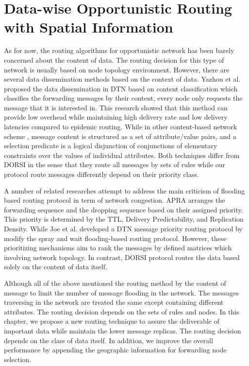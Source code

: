\chapter{Data-wise Opportunistic Routing with Spatial Information}
\label{DORSI}
As for now, the routing algorithms for opportunistic network has been barely concerned about the content of data. 
The routing decision for this type of network is usually based on node topology environment. 
However, there are several data dissemination methods based on the context of data. 
Yazhou et al. \cite{Jiao2009} proposed the data dissemination in DTN based on content classification which classifies the forwarding messages by their content, every node only requests the message that it is interested in. 
This research showed that this method can provide low overhead while maintaining high delivery rate and low delivery latencies compared to epidemic routing. 
While in other content-based network scheme \cite{Carzaniga2004}, message content is structured as a set of attribute/value pairs, and a selection predicate is a logical disjunction of conjunctions of elementary constraints over the values of individual attributes. 
Both techniques differ from DORSI in the sense that they route all messages by sets of rules while our protocol route messages differently depend on their priority class.

A number of related researches attempt to address the main criticism of flooding based routing protocol in term of network congestion. 
APRA \cite{Jin2009} arranges the forwarding sequence and the dropping sequence based on their assigned priority. 
This priority is determined by the TTL, Delivery Predictability, and Replication Density. 
While Joe et al. \cite{Joe2010} developed a DTN message priority routing protocol by modify the spray and wait \cite{Spyropoulos2005} flooding-based routing protocol. 
However, these prioritizing mechanisms aim to rank the messages by defined matrices which involving network topology. 
In contrast, DORSI protocol routes the data based solely on the content of data itself.

Although all of the above mentioned the routing method by the content of message to limit the number of message flooding in the network. The messages traversing in the network are treated the same except containing different attributes. The routing decision depends on the sets of rules and nodes. In this chapter, we propose a new routing technique to assure the deliverable of important data while maintain the lower message replicas. The routing decision depends on the class of data itself. In addition, we improve the overall performance by appending the geographic information for forwarding node selection.

